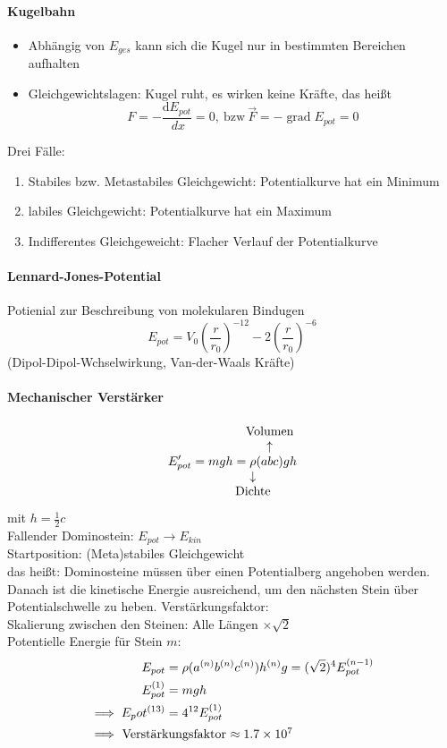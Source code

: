 \documentclass[a4paper]{scrartcl}
\DeclareMathOperator{\grad}{grad}
\renewcommand{\d}{\mathrm{d}}
\renewcommand{\v}[1]{\vec{#1}}
\newcommand{\dd}[2]{\frac{\d #1}{\ d#2}}
\theoremstyle{definition}
\theoremstyle{plain}
\theoremstyle{plain}
\theoremstyle{remark}
\theoremstyle{remark}
\theoremstyle{remark}
\begin{document}
\paragraph{Kugelbahn}
\label{sec-5-1-3-1}
\begin{itemize}
\item Abhängig von $E_{ges}$ kann sich die Kugel nur in bestimmten Bereichen aufhalten
\item Gleichgewichtslagen: Kugel ruht, es wirken keine Kräfte, das heißt
\[F = -\dd{E_{pot}}{x} = 0, ~\text{bzw}~ \v F = -\grad E_{pot} = 0\]
\end{itemize}

Drei Fälle:
\begin{enumerate}
\item Stabiles bzw. Metastabiles Gleichgewicht: Potentialkurve hat ein Minimum
\item labiles Gleichgewicht: Potentialkurve hat ein Maximum
\item Indifferentes Gleichgeweicht: Flacher Verlauf der Potentialkurve
\end{enumerate}
\paragraph{Lennard-Jones-Potential}
\label{sec-5-1-3-2}
Potienial zur Beschreibung von molekularen Bindugen
\[E_{pot} = V_0 (\frac{r}{r_0})^{-12} - 2(\frac{r}{r_0})^{-6}\]
(Dipol-Dipol-Wchselwirkung, Van-der-Waals Kräfte)
\paragraph{Mechanischer Verstärker}
\label{sec-5-1-3-3}
\[E_{pot}' = m g h = \underarrow[\rho]{Dichte} \overarrow[(a b c)]{Volumen} g h\]
mit $h = \frac{1}{2}c$ \\
     Fallender Dominostein: $E_{pot}  \to E_{kin}$ \\
     Startposition: (Meta)stabiles Gleichgewicht \\
     das heißt: Dominosteine müssen über einen Potentialberg angehoben werden. Danach ist die kinetische Energie
ausreichend, um den nächsten Stein über Potentialschwelle zu heben.
Verstärkungsfaktor: \\
     Skalierung zwischen den Steinen: Alle Längen $\times \sqrt{2}$ \\
     Potentielle Energie für Stein $m$:
\begin{align*}
E_{pot} &= \rho(a^{(n)}b^{(n)}c^{(n)}) h^{(n)} g = (\sqrt{2})^4 E_{pot}^{(n-1)} \\
E_{pot}^{(1)} &= m g h \\
\implies E_pot^{(13)} &= 4^{12} E_{pot}^{(1)} \\
\intertext{$\implies$ Verstärkungsfaktor $\approx \SI{1.7e7}{}$}
\end{align*}
\end{document}
